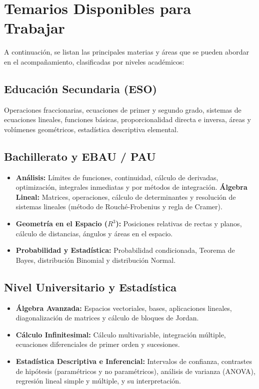 \documentclass[11pt,a4paper]{article}
\begin{document}
\section{Temarios Disponibles para Trabajar}
A continuación, se listan las principales materias y áreas que se pueden abordar en el acompañamiento, clasificadas por niveles académicos:

\subsection{Educación Secundaria (ESO)}
Operaciones fraccionarias, ecuaciones de primer y segundo grado, sistemas de ecuaciones lineales, funciones básicas, proporcionalidad directa e inversa, áreas y volúmenes geométricos, estadística descriptiva elemental.

\subsection{Bachillerato y EBAU / PAU}
\begin{itemize}
    \item \textbf{Análisis:} Límites de funciones, continuidad, cálculo de derivadas, optimización, integrales inmediatas y por métodos de integración.
    \textbf{Álgebra Lineal:} Matrices, operaciones, cálculo de determinantes y resolución de sistemas lineales (método de Rouché-Frobenius y regla de Cramer).
    \item \textbf{Geometría en el Espacio ($R^3$):} Posiciones relativas de rectas y planos, cálculo de distancias, ángulos y áreas en el espacio.
    \item \textbf{Probabilidad y Estadística:} Probabilidad condicionada, Teorema de Bayes, distribución Binomial y distribución Normal.
\end{itemize}

\subsection{Nivel Universitario y Estadística}
\begin{itemize}
    \item \textbf{Álgebra Avanzada:} Espacios vectoriales, bases, aplicaciones lineales, diagonalización de matrices y cálculo de bloques de Jordan.
    \item \textbf{Cálculo Infinitesimal:} Cálculo multivariable, integración múltiple, ecuaciones diferenciales de primer orden y sucesiones.
    \item \textbf{Estadística Descriptiva e Inferencial:} Intervalos de confianza, contrastes de hipótesis (paramétricos y no paramétricos), análisis de varianza (ANOVA), regresión lineal simple y múltiple, y su interpretación.
\end{itemize}
\end{document}

